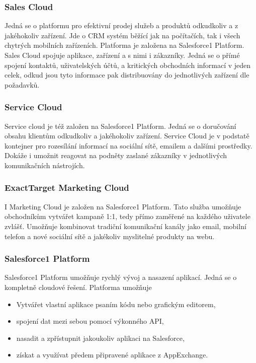 \subsubsection{Sales Cloud}
Jedná se o platformu pro efektivní prodej služeb a produktů odkudkoliv a z jakéhokoliv zařízení. Jde o CRM systém běžící jak na počítačích, tak i všech chytrých mobilních zařízeních. Platforma je založena na Salesforce1 Platform. Sales Cloud spojuje aplikace, zařízení a s nimi i zákazníky. Jedná se o přímé spojení kontaktů, uživatelských účtů, a kritických obchodních informací v jeden celek, odkud jsou tyto informace pak distribuovány do jednotlivých zařízení dle požadavků.\cite{salesforce:salesCloud}

\subsubsection{Service Cloud}
Service cloud je též založen na Salesforce1 Platform. Jedná se o doručování obsahu klientům odkudkoliv a jakéhokoliv zařízení. Service Cloud je v podstatě kontejner pro rozesílání informací na sociální sítě, emailem a dalšími prostředky. Dokáže i umožnit reagovat na podněty zaslané zákazníky v jednotlivých komunikačních nástrojích.\cite{salesforce:serviceCloud}

\subsubsection{ExactTarget Marketing Cloud}
I Marketing Cloud je založen na Salesforce1 Platform. Tato služba umožňuje obchodníkům vytvářet kampaně 1:1, tedy přímo zaměřené na každého uživatele zvlášť. Umožňuje kombinovat tradiční komunikační kanály jako email, mobilní telefon a nové sociální sítě a jakékoliv myslitelné produkty na webu.\cite{salesforce:marketingCloud}

\subsubsection{Salesforce1 Platform}
Salesforce1 Platform umožňuje rychlý vývoj a nasazení aplikací. Jedná se o kompletně cloudové řešení\cite{salesforce:platform}. Platforma umožňuje
	\begin{itemize}
		\item Vytvářet vlastní aplikace psaním kódu nebo grafickým editorem,
		\item spojení dat mezi sebou pomocí výkonného API,
		\item nasadit a zpřístupnit jakoukoliv aplikaci na Salesforce,
		\item získat a využívat předem připravené aplikace z AppExchange.
	\end{itemize}

